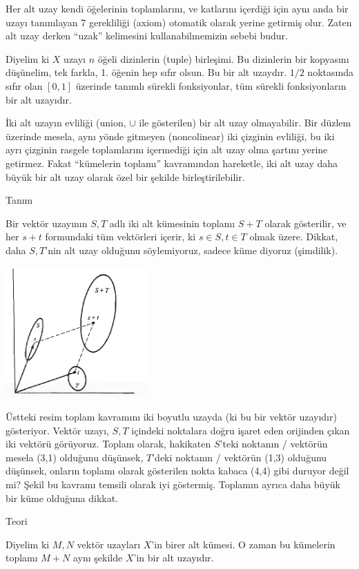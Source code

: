 \documentclass[12pt,fleqn]{article}\usepackage{../../common}
\begin{document}
Her alt uzay kendi öğelerinin toplamlarını, ve katlarını içerdiği için aynı
anda bir uzayı tanımlayan 7 gerekliliği (axiom) otomatik olarak yerine
getirmiş olur. Zaten alt uzay derken ``uzak'' kelimesini kullanabilmemizin
sebebi budur.

Diyelim ki $X$ uzayı $n$ öğeli dizinlerin (tuple) birleşimi. Bu dizinlerin
bir kopyasını düşünelim, tek farkla, 1. öğenin hep sıfır olsun. Bu bir alt
uzaydır. $1/2$ noktasında sıfır olan $[0,1]$ üzerinde tanımlı sürekli
fonksiyonlar, tüm sürekli fonksiyonların bir alt uzayıdır.

İki alt uzayın evliliği (union, $\cup$ ile gösterilen) bir alt uzay
olmayabilir. Bir düzlem üzerinde mesela, aynı yönde gitmeyen (noncolinear)
iki çizginin evliliği, bu iki ayrı çizginin rasgele toplamlarını içermediği
için alt uzay olma şartını yerine getirmez. Fakat ``kümelerin toplamı''
kavramından hareketle, iki alt uzay daha büyük bir alt uzay olarak özel bir
şekilde birleştirilebilir.

Tanım

Bir vektör uzayının $S,T$ adlı iki alt kümesinin toplamı $S+T$ olarak
gösterilir, ve her $s+t$ formundaki tüm vektörleri içerir, ki $s \in S,t \in T$ 
olmak üzere. Dikkat, daha $S,T$'nin alt uzay olduğunu söylemiyoruz,
sadece küme diyoruz (şimdilik).

\includegraphics[height=5cm]{3_1.png}

Üstteki resim toplam kavramını iki boyutlu uzayda (ki bu bir vektör
uzayıdır) gösteriyor. Vektör uzayı, $S,T$ içindeki noktalara doğru işaret
eden orijinden çıkan iki vektörü görüyoruz. Toplam olarak, hakikaten
$S$'teki noktanın / vektörün mesela (3,1) olduğunu düşünsek, $T$'deki
noktanın / vektörün (1,3) olduğunu düşünsek, onların toplamı olarak
gösterilen nokta kabaca (4,4) gibi duruyor değil mi? Şekil bu kavramı
temsili olarak iyi göstermiş. Toplamın ayrıca daha büyük bir küme olduğuna
dikkat.

Teori 

Diyelim ki $M,N$ vektör uzayları $X$'in birer alt kümesi. O zaman bu kümelerin
toplamı $M + N$ aynı şekilde $X$'in bir alt uzayıdır. 
\end{document}
